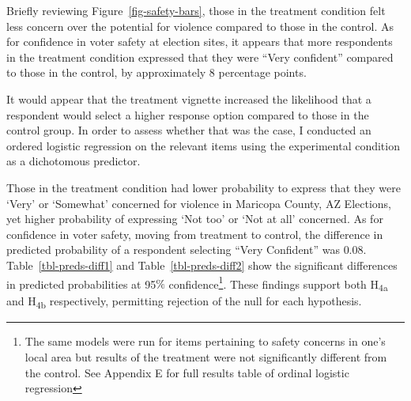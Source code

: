\documentclass[
  12pt,
  letterpaper,
]{article}
\begin{document}
Briefly reviewing Figure~\ref{fig-safety-bars}, those in the treatment
condition felt less concern over the potential for violence compared to
those in the control. As for confidence in voter safety at election
sites, it appears that more respondents in the treatment condition
expressed that they were ``Very confident'' compared to those in the
control, by approximately \(8\) percentage points.

\newpage{}

It would appear that the treatment vignette increased the likelihood
that a respondent would select a higher response option compared to
those in the control group. In order to assess whether that was the
case, I conducted an ordered logistic regression on the relevant items
using the experimental condition as a dichotomous predictor.

Those in the treatment condition had lower probability to express that
they were `Very' or `Somewhat' concerned for violence in Maricopa
County, AZ Elections, yet higher probability of expressing `Not too' or
`Not at all' concerned. As for confidence in voter safety, moving from
treatment to control, the difference in predicted probability of a
respondent selecting ``Very Confident'' was \(0.08\).
Table~\ref{tbl-preds-diff1} and Table~\ref{tbl-preds-diff2} show the
significant differences in predicted probabilities at 95\(\%\)
confidence\footnote{The same models were run for items pertaining to
  safety concerns in one's local area but results of the treatment were
  not significantly different from the control. See Appendix E for full
  results table of ordinal logistic regression}. These findings support
both H\textsubscript{4a} and H\textsubscript{4b} respectively,
permitting rejection of the null for each hypothesis.
\end{document}
